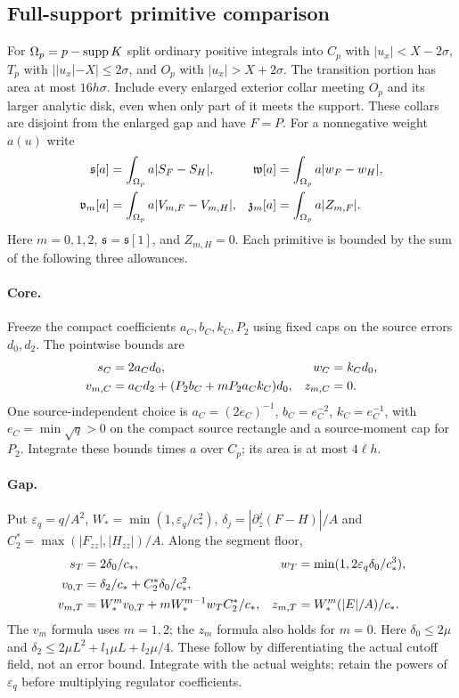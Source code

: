 \subsection{Full-support primitive comparison}
For $\Omega_p=p-\operatorname{supp} K$ split ordinary positive integrals into
$C_p$ with $|u_x|<X-2\sigma$, $T_p$ with $||u_x|-X|\le2\sigma$,
and $O_p$ with $|u_x|>X+2\sigma$. The transition portion has area at
most $16h\sigma$. Include every enlarged exterior collar meeting $O_p$
and its larger analytic disk, even when only part of it meets the support.
These collars are disjoint from the enlarged gap and have $F=P$.
For a nonnegative weight $a(u)$ write
\begin{align}
 \mathfrak s[a]&=\int_{\Omega_p}a|S_F-S_H|,&
 \mathfrak w[a]&=\int_{\Omega_p}a|w_F-w_H|,\notag\\
 \mathfrak v_m[a]&=\int_{\Omega_p}a|V_{m,F}-V_{m,H}|,&
 \mathfrak z_m[a]&=\int_{\Omega_p}a|Z_{m,F}|.
 \label{eq:sj-ledger-def}
\end{align}
Here $m=0,1,2$, $\mathfrak s=\mathfrak s[1]$, and $Z_{m,H}=0$.
Each primitive is bounded by the sum of the following three allowances.

\paragraph{Core.}
Freeze the compact coefficients $a_C,b_C,k_C,P_2$ using fixed caps on
the source errors $d_0,d_2$. The pointwise bounds are
\begin{align}
 s_C&=2a_Cd_0,&w_C&=k_Cd_0,\notag\\
 v_{m,C}&=a_Cd_2+(P_2b_C+mP_2a_Ck_C)d_0,&z_{m,C}&=0.
 \label{eq:sj-core}
\end{align}
One source-independent choice is $a_C=(2e_C)^{-1}$,
$b_C=e_C^{-2}$, $k_C=e_C^{-1}$, with $e_C=\min\sqrt q>0$ on the
compact source rectangle and a source-moment cap for $P_2$. Integrate
these bounds times $a$ over $C_p$; its area is at most $4\ell h$.

\paragraph{Gap.}
Put $\varepsilon_q=q/A^2$, $W_* =\min(1,\varepsilon_q/c_*^2)$,
$\delta_j=|\partial_z^j(F-H)|/A$ and
$C_2^*=\max(|F_{zz}|,|H_{zz}|)/A$. Along the segment floor,
\begin{align}
 s_T&=2\delta_0/c_*,&w_T&=\min(1,2\varepsilon_q\delta_0/c_*^3),\notag\\
 v_{0,T}&=\delta_2/c_*+C_2^*\delta_0/c_*^2,\notag\\
 v_{m,T}&=W_*^m v_{0,T}+mW_*^{m-1}w_T C_2^*/c_*,&
 z_{m,T}&=W_*^m(|E|/A)/c_*.
 \label{eq:sj-gap-ledger}
\end{align}
The $v_m$ formula uses $m=1,2$; the $z_m$ formula also holds for $m=0$.
Here $\delta_0\le2\mu$ and
$\delta_2\le2\mu L^2+l_1\mu L+l_2\mu/4$. These follow by
differentiating the actual cutoff field, not an error bound.
Integrate with the actual weights; retain the powers of $\varepsilon_q$
before multiplying regulator coefficients.

